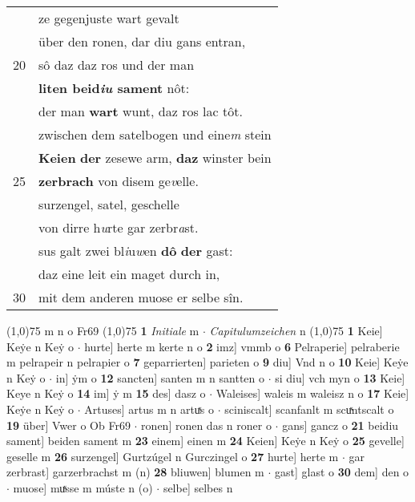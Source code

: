 \documentclass[8pt,a4paper,notitlepage]{article}
\begin{document}
\begin{table}[ht]
\begin{minipage}[t]{0.5\linewidth}
\begin{tabular}{rl}
 & ze gegenjuste wart gevalt\\ 
 & über den ronen, dar diu gans entran,\\ 
20 & sô daz daz ros und der man\\ 
 & \textbf{liten beid\textit{iu} sament} nôt:\\ 
 & der man \textbf{wart} wunt, daz ros lac tôt.\\ 
 & zwischen dem satelbogen und eine\textit{m} stein\\ 
 & \textbf{Keien} \textbf{der} zesewe arm, \textbf{daz} winster bein\\ 
25 & \textbf{zerbrach} von disem ge\textit{v}elle.\\ 
 & surzengel, satel, geschelle\\ 
 & von dirre h\textit{u}rte gar zerbr\textit{a}st.\\ 
 & sus galt zwei bl\textit{i}u\textit{w}en \textbf{dô} \textbf{der} gast:\\ 
 & daz eine leit ein maget durch in,\\ 
30 & mit dem anderen muose er selbe sîn.\\ 
\end{tabular}
\scriptsize
\line(1,0){75} \newline
m n o Fr69 \newline
\line(1,0){75} \newline
\textbf{1} \textit{Initiale} m   $\cdot$ \textit{Capitulumzeichen} n  \newline
\line(1,0){75} \newline
\textbf{1} Keie] Keẏe n Keẏ o  $\cdot$ hurte] herte m kerte n o \textbf{2} imz] vmmb o \textbf{6} Pelraperie] pelraberie m pelrapeir n pelrapier o \textbf{7} geparrierten] parieten o \textbf{9} diu] Vnd n o \textbf{10} Keie] Keẏe n Keẏ o  $\cdot$ in] ẏm o \textbf{12} sancten] santen m n santten o  $\cdot$ si diu] vch myn o \textbf{13} Keie] Keye n Keẏ o \textbf{14} im] ẏ m \textbf{15} des] dasz o  $\cdot$ Waleises] waleis m waleisz n o \textbf{17} Keie] Keẏe n Keẏ o  $\cdot$ Artuses] artus m n artuͯs o  $\cdot$ sciniscalt] scanfanlt m scuͯntscalt o \textbf{19} über] Vwer o Ob Fr69  $\cdot$ ronen] ronen das n roner o  $\cdot$ gans] gancz o \textbf{21} beidiu sament] beiden sament m \textbf{23} einem] einen m \textbf{24} Keien] Keẏe n Keẏ o \textbf{25} gevelle] geselle m \textbf{26} surzengel] Gurtzúgel n Gurczingel o \textbf{27} hurte] herte m  $\cdot$ gar zerbrast] garzerbrachst m (n) \textbf{28} bliuwen] blumen m  $\cdot$ gast] glast o \textbf{30} dem] den o  $\cdot$ muose] muͯsse m múste n (o)  $\cdot$ selbe] selbes n \newline
\end{minipage}
\end{table}
\end{document}

